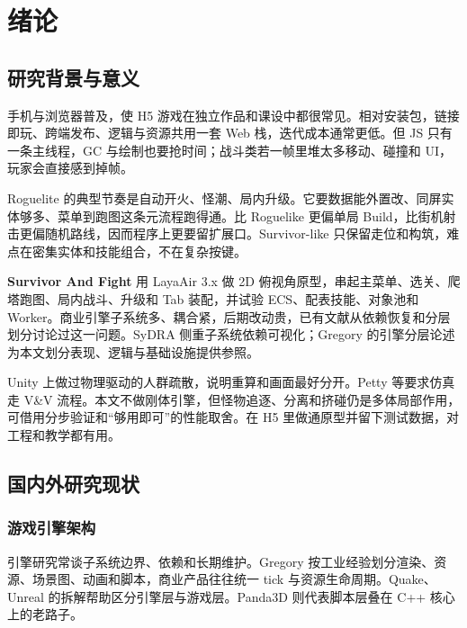 \documentclass[UTF8,a4paper]{ctexart}
\begin{document}

\chapter{绪论}
\label{chap:intro}

\section{研究背景与意义}

手机与浏览器普及，使 H5 游戏在独立作品和课设中都很常见。相对安装包，链接即玩、跨端发布、逻辑与资源共用一套 Web 栈，迭代成本通常更低。但 JS 只有一条主线程，GC 与绘制也要抢时间；战斗类若一帧里堆太多移动、碰撞和 UI，玩家会直接感到掉帧。

Roguelite 的典型节奏是自动开火、怪潮、局内升级。它要数据能外置改、同屏实体够多、菜单到跑图这条元流程跑得通。比 Roguelike 更偏单局 Build，比街机射击更偏随机路线，因而程序上更要留扩展口。Survivor-like 只保留走位和构筑，难点在密集实体和技能组合，不在复杂按键。

\textbf{Survivor And Fight} 用 LayaAir 3.x 做 2D 俯视角原型，串起主菜单、选关、爬塔跑图、局内战斗、升级和 Tab 装配，并试验 ECS、配表技能、对象池和 Worker。商业引擎子系统多、耦合紧，后期改动贵，已有文献从依赖恢复和分层划分讨论过这一问题\cite{ullmann2025sydra,gregory2018game,baabad2020degradation}。SyDRA 侧重子系统依赖可视化\cite{ullmann2025sydra}；Gregory 的引擎分层论述为本文划分表现、逻辑与基础设施提供参照\cite{gregory2018game}。

Unity 上做过物理驱动的人群疏散\cite{cantrell2018unity,bott2014unreal}，说明重算和画面最好分开。Petty 等要求仿真走 V\&V 流程\cite{petty2010vv}。本文不做刚体引擎，但怪物追逐、分离和挤碰仍是多体局部作用，可借用分步验证和“够用即可”的性能取舍。在 H5 里做通原型并留下测试数据，对工程和教学都有用。

\section{国内外研究现状}

\subsection{游戏引擎架构}

引擎研究常谈子系统边界、依赖和长期维护。Gregory 按工业经验划分渲染、资源、场景图、动画和脚本，商业产品往往统一 tick 与资源生命周期\cite{gregory2018game}。Quake、Unreal 的拆解帮助区分引擎层与游戏层\cite{munro2009quake,agrahari2021unreal}。Panda3D 则代表脚本层叠在 C++ 核心上的老路子\cite{goslin2004panda}。
\end{document}
